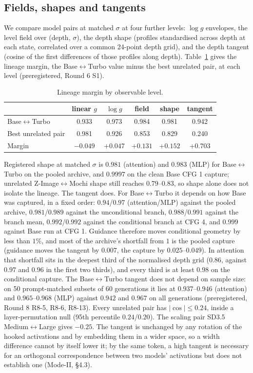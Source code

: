\documentclass[11pt]{article}
\newcommand{\BT}{Base$\leftrightarrow$Turbo}
\begin{document}
\subsection{Fields, shapes and tangents}
We compare model pairs at matched $\sigma$ at four further levels: $\log g$ envelopes, the level field over (depth, $\sigma$), the depth shape (profiles standardised across depth at each state, correlated over a common 24-point depth grid), and the depth tangent (cosine of the first differences of those profiles along depth). Table~\ref{tab:hierarchy} gives the lineage margin, the \BT{} value minus the best unrelated pair, at each level (preregistered, Round 6 S1).

\begin{table}[h]
\centering\small
\caption{Lineage margin by observable level.}
\label{tab:hierarchy}
\begin{tabular}{lccccc}
\toprule
 & linear $g$ & $\log g$ & field & shape & tangent\\
\midrule
Base$\leftrightarrow$Turbo & 0.933 & 0.973 & 0.984 & 0.981 & 0.942\\
Best unrelated pair & 0.981 & 0.926 & 0.853 & 0.829 & 0.240\\
Margin & $-0.049$ & $+0.047$ & $+0.131$ & $+0.152$ & $+0.703$\\
\bottomrule
\end{tabular}
\end{table}

Registered shape at matched $\sigma$ is $0.981$ (attention) and $0.983$ (MLP) for \BT{} on the pooled archive, and $0.9997$ on the clean Base CFG 1 capture; unrelated Z-Image$\leftrightarrow$Mochi shape still reaches $0.79$--$0.83$, so shape alone does not isolate the lineage. The tangent does. For \BT{} it depends on how Base was captured, in a fixed order: $0.94$/$0.97$ (attention/MLP) against the pooled archive, $0.981$/$0.989$ against the unconditional branch, $0.988$/$0.991$ against the branch mean, $0.992$/$0.992$ against the conditional branch at CFG 4, and $0.999$ against Base run at CFG 1. Guidance therefore moves conditional geometry by less than $1\%$, and most of the archive's shortfall from $1$ is the pooled capture (guidance moves the tangent by $0.007$, the capture by $0.025$--$0.049$). In attention that shortfall sits in the deepest third of the normalised depth grid ($0.86$, against $0.97$ and $0.96$ in the first two thirds), and every third is at least $0.98$ on the conditional capture. The \BT{} tangent does not depend on sample size: on 50 prompt-matched subsets of 60 generations it lies at $0.937$--$0.946$ (attention) and $0.965$--$0.968$ (MLP) against $0.942$ and $0.967$ on all generations (preregistered, Round 8 R8-5, R8-6, R8-13). Every unrelated pair has $|\cos|\le0.24$, inside a layer-permutation null (95th percentile $0.24$/$0.20$). The scaling pair SD3.5 Medium$\leftrightarrow$Large gives $-0.25$. The tangent is unchanged by any rotation of the hooked activations and by embedding them in a wider space, so a width difference cannot by itself lower it; by the same token, a high tangent is necessary for an orthogonal correspondence between two models' activations but does not establish one (Mode-II, \S4.3).
\end{document}
